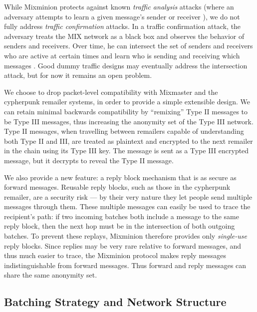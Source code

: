 \documentclass{llncs}
\begin{document}
While Mixminion protects against known \emph{traffic analysis} attacks
(where an adversary attempts to learn a given message's sender or
receiver \cite{rackoff93cryptographic,raymond00}), we do not fully
address \emph{traffic confirmation} attacks. In a traffic confirmation
attack, the adversary treats the MIX network as a black box and
observes the behavior of senders and receivers. Over time, he can
intersect the set of senders and receivers who are active at certain
times and learn who is sending and receiving which messages
\cite{langos02}. Good dummy traffic designs may eventually address the
intersection attack, but for now it remains an open problem.

We choose to drop packet-level compatibility with Mixmaster and the
cypherpunk remailer systems, in order to provide a simple extensible
design. We can retain minimal backwards compatibility by ``remixing''
Type II messages to be Type III messages, thus increasing the anonymity
set of the Type III network. Type II messages, when travelling between
remailers capable of understanding both Type II and III, are treated
as plaintext and encrypted to the next remailer in the chain using its
Type III key. The message is sent as a Type III encrypted message, but
it decrypts to reveal the Type II message.

We also provide a new feature: a reply block mechanism that is as secure
as forward messages.
Reusable reply blocks, such as those in the cypherpunk remailer, are a
security risk --- by their very nature they let people send multiple
messages through them.  These multiple messages can easily be used to
trace the recipient's path: if two incoming batches both include a
message to the same reply block, then the next hop must be in the
intersection of both outgoing batches.  To prevent these replays,
Mixminion therefore provides only \emph{single-use} reply blocks. Since
replies may be very rare relative to forward messages, and thus
much easier to trace, the Mixminion protocol makes reply messages
indistinguishable from forward messages. Thus forward and reply messages
can share the same anonymity set.

\subsection{Batching Strategy and Network Structure}
\label{subsec:batching}
\end{document}
